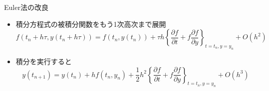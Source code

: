 \begin{frame}[t,fragile]{Euler法の改良}
  \begin{itemize}
    \setlength{\itemsep}{1em}
  \item 積分方程式の被積分関数をもう1次高次まで展開
    \[
    f(t_n+h\tau, y(t_n+h\tau)) = f(t_n, y(t_n)) +
    \tau h
    \left\{
    \frac{\partial f}{\partial t}
    + f \frac{\partial f}{\partial y}
    \right\}_{t=t_n, y=y_n}
    \!\!\!\!\!\!\!\!\!\!\!\! + O(h^2)
    \]
  \item 積分を実行すると
    \[
    y(t_{n+1}) = y(t_n) + h f(t_n, y_n) + \frac{1}{2}h^2
    \left\{
    \frac{\partial f}{\partial t}
    + f \frac{\partial f}{\partial y}
    \right\}_{t=t_n, y=y_n}
    \!\!\!\!\!\!\!\!\!\!\!\! + O(h^3)
    \]
  \end{itemize}
\end{frame}
